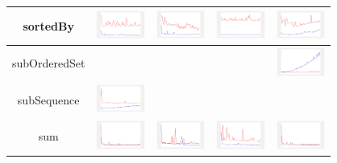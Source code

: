 \begin{longtable}{ c|c c c c}
sortedBy
&
\includegraphics[width=1.6cm]{../graphs/sequence/small/sortedBy}
&
\includegraphics[width=1.6cm]{../graphs/set/small/sortedBy}
&
\includegraphics[width=1.6cm]{../graphs/bag/small/sortedBy}
&
\includegraphics[width=1.6cm]{../graphs/orderedset/small/sortedBy}
\\\hline

subOrderedSet 
&
&
&
&
\includegraphics[width=1.6cm]{../graphs/orderedset/small/Suborderedset}
\\\hline

subSequence
&
\includegraphics[width=1.6cm]{../graphs/sequence/small/SubSequence}
&
&
&
\\\hline

sum
&
\includegraphics[width=1.6cm]{../graphs/sequence/small/Sum}
&
\includegraphics[width=1.6cm]{../graphs/set/small/Sum}
&
\includegraphics[width=1.6cm]{../graphs/bag/small/Sum}
&
\includegraphics[width=1.6cm]{../graphs/orderedset/small/Sum}
\\\hline


\end{longtable}
